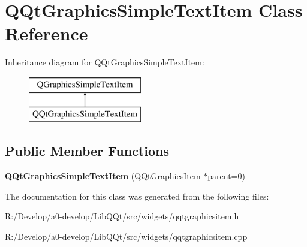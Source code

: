 \hypertarget{class_q_qt_graphics_simple_text_item}{}\section{Q\+Qt\+Graphics\+Simple\+Text\+Item Class Reference}
\label{class_q_qt_graphics_simple_text_item}
Inheritance diagram for Q\+Qt\+Graphics\+Simple\+Text\+Item\+:\begin{figure}[H]
\begin{center}
\leavevmode
\includegraphics[height=2.000000cm]{class_q_qt_graphics_simple_text_item}
\end{center}
\end{figure}
\subsection*{Public Member Functions}
\begin{DoxyCompactItemize}
\item 
\mbox{\label{class_q_qt_graphics_simple_text_item_a7dbb9376b32f71c55f467e801da4502c}} 
{\bfseries Q\+Qt\+Graphics\+Simple\+Text\+Item} (\mbox{\hyperlink{class_q_qt_graphics_item}{Q\+Qt\+Graphics\+Item}} $\ast$parent=0)
\end{DoxyCompactItemize}


The documentation for this class was generated from the following files\+:\begin{DoxyCompactItemize}
\item 
R\+:/\+Develop/a0-\/develop/\+Lib\+Q\+Qt/src/widgets/qqtgraphicsitem.\+h\item 
R\+:/\+Develop/a0-\/develop/\+Lib\+Q\+Qt/src/widgets/qqtgraphicsitem.\+cpp\end{DoxyCompactItemize}
